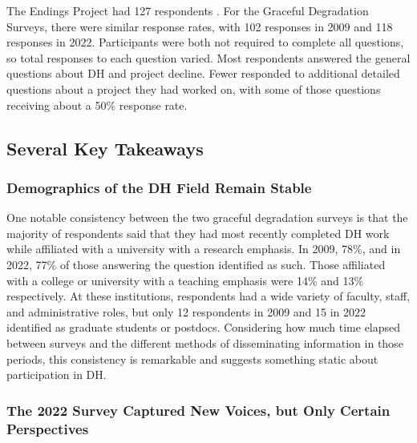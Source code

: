 \documentclass[final]{anthology-ch}
\begin{document}
The Endings Project had 127 respondents \cite{endings2024survey}. For the Graceful Degradation Surveys, there were similar response rates, with 102 responses in 2009 and 118 responses in 2022. Participants were both not required to complete all questions, so total responses to each question varied. Most respondents answered the general questions about DH and project decline. Fewer responded to additional detailed questions about a project they had worked on, with some of those questions receiving about a 50\% response rate.

\subsection{Several Key Takeaways}

\subsubsection{Demographics of the DH Field Remain Stable}

One notable consistency between the two graceful degradation surveys is that the majority of respondents said that they had most recently completed DH work while affiliated with a university with a research emphasis. In 2009, 78\%, and in 2022, 77\% of those answering the question identified as such. Those affiliated with a college or university with a teaching emphasis were 14\% and 13\% respectively. At these institutions, respondents had a wide variety of faculty, staff, and administrative roles, but only 12 respondents in 2009 and 15 in 2022 identified as graduate students or postdocs. Considering how much time elapsed between surveys and the different methods of disseminating information in those periods, this consistency is remarkable and suggests something static about participation in DH.

\subsubsection{The 2022 Survey Captured New Voices, but Only Certain Perspectives}
\end{document}
